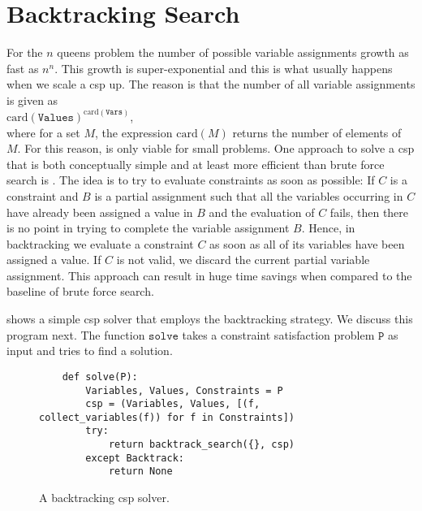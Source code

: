 \section{Backtracking Search}
For the $n$ queens problem the number of possible variable assignments growth as fast as $n^n$.
This growth is super-exponential and this is what usually happens when we scale a \ac{csp} up. 
The reason is that the number of all variable assignments is given as
\\[0.2cm]
\hspace*{1.3cm}
$\mathrm{card}(\texttt{Values})^{\mathrm{card}(\texttt{Vars})}$,
\\[0.2cm]
where for a set $M$, the expression $\mathrm{card}(M)$ returns the number of elements of $M$.
For this reason,  is only viable for small problems.  One approach to solve a \ac{csp}
that is both conceptually simple and at least more efficient than brute force search is .  The idea
is to try to evaluate constraints as soon as possible:  If $C$ is a constraint and $B$ is a partial assignment
such that all the variables occurring in $C$ have already been assigned a value in $B$ and the evaluation of $C$
fails, then there is no point in trying to complete the variable assignment $B$.  Hence, in backtracking we
evaluate a constraint $C$ as soon as all of its variables have been assigned a value.  If $C$ is not valid, we
discard the current partial variable assignment.  This approach can result in huge time savings
when compared to the baseline of brute force search.

 shows a simple \ac{csp} solver 
that employs the backtracking strategy.  
We discuss this program next.  The function $\texttt{solve}$ takes a constraint
satisfaction problem $\texttt{P}$ as input and tries to find a solution.  


\begin{figure}[!ht]
\centering
\begin{verbatim}
    def solve(P):
        Variables, Values, Constraints = P
        csp = (Variables, Values, [(f, collect_variables(f)) for f in Constraints])
        try:
            return backtrack_search({}, csp)
        except Backtrack:
            return None
\end{verbatim}
\vspace*{-0.3cm}
\caption{A backtracking \ac{csp} solver.}
\label{fig:Backtrack-Solver.ipynb}
\end{figure}

